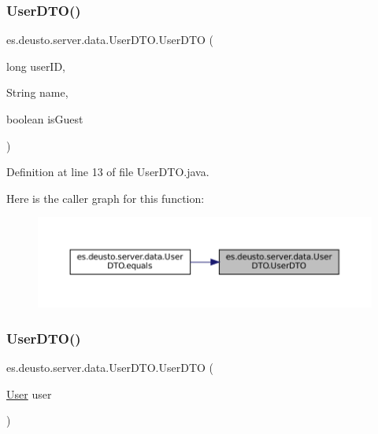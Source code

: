 \subsubsection{\texorpdfstring{UserDTO()}{UserDTO()}\hspace{0.1cm}{\footnotesize\ttfamily [1/2]}}
{\footnotesize\ttfamily es.\+deusto.\+server.\+data.\+User\+D\+T\+O.\+User\+D\+TO (\begin{DoxyParamCaption}\item[{long}]{user\+ID,  }\item[{String}]{name,  }\item[{boolean}]{is\+Guest }\end{DoxyParamCaption})}



Definition at line 13 of file User\+D\+T\+O.\+java.

Here is the caller graph for this function\+:
\nopagebreak
\begin{figure}[H]
\begin{center}
\leavevmode
\includegraphics[width=350pt]{classes_1_1deusto_1_1server_1_1data_1_1_user_d_t_o_a00e605694b6157bcf7a1acc5e2adc735_icgraph}
\end{center}
\end{figure}
\mbox{\label{classes_1_1deusto_1_1server_1_1data_1_1_user_d_t_o_ab05044a5b24bdbdcc1bbe582b7268b71}} 
\subsubsection{\texorpdfstring{UserDTO()}{UserDTO()}\hspace{0.1cm}{\footnotesize\ttfamily [2/2]}}
{\footnotesize\ttfamily es.\+deusto.\+server.\+data.\+User\+D\+T\+O.\+User\+D\+TO (\begin{DoxyParamCaption}\item[{\mbox{\hyperlink{classes_1_1deusto_1_1server_1_1jdo_1_1_user}{User}}}]{user }\end{DoxyParamCaption})}



